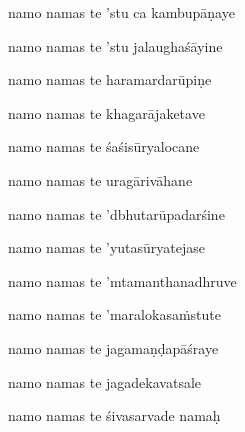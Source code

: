\nemslokad 
namo namas te 'stu ca kambupāṇaye \veg\dontdisplaylinenum

\ujvers\nemsloka 
namo namas te 'stu jalaughaśāyine
\dontdisplaylinenum

\nemslokab 
namo namas te haramardarūpiṇe \danda\dontdisplaylinenum

\nemslokac 
namo namas te khagarājaketave
\dontdisplaylinenum

\nemslokad 
namo namas te śaśisūryalocane \veg\dontdisplaylinenum

\ujvers\nemsloka 
namo namas te uragārivāhane
\dontdisplaylinenum

\nemslokab 
namo namas te 'dbhutarūpadarśine \danda\dontdisplaylinenum

\nemslokac 
namo namas te 'yutasūryatejase
\dontdisplaylinenum

\nemslokad 
namo namas te 'mtamanthanadhruve \veg\dontdisplaylinenum

\ujvers\nemsloka 
namo namas te 'maralokasa\.mstute
\dontdisplaylinenum

\nemslokab 
namo namas te jagamaṇḍapāśraye \danda\dontdisplaylinenum

\nemslokac 
namo namas te jagadekavatsale
\dontdisplaylinenum

\nemslokad 
namo namas te śivasarvade namaḥ \veg\dontdisplaylinenum

